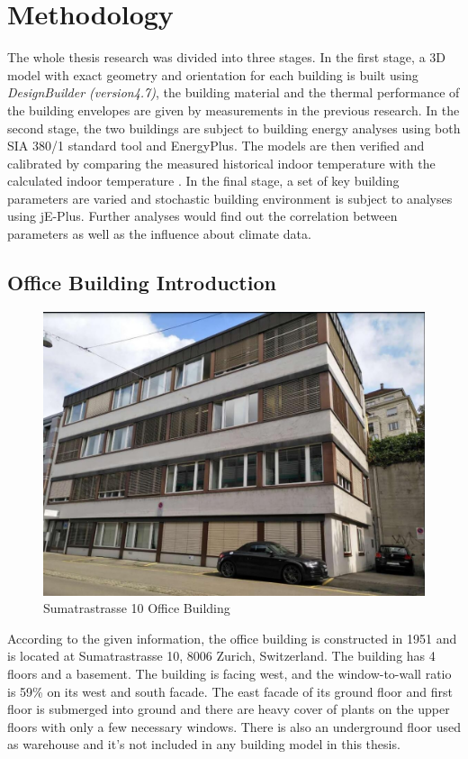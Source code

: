 \documentclass[11pt, a4paper]{article}
\theoremstyle{definition}
\begin{document}
\newpage
\section{Methodology}
	The whole thesis research was divided into three stages. In the first stage, a 3D model with exact geometry and orientation for each building is built using \textit{DesignBuilder (version4.7)}, the building material and the thermal performance of the building envelopes are given by measurements in the previous research. In the second stage, the two buildings are subject to building energy analyses using both SIA 380/1 standard tool and EnergyPlus. The models are then verified and calibrated by comparing the measured historical indoor temperature with the calculated indoor temperature . In the final stage, a set of key building parameters are varied and stochastic building environment is subject to analyses using jE-Plus. Further analyses would find out the correlation between parameters as well as the influence about climate data.

	\subsection{Office Building Introduction}
		
		\begin{figure}[h!]
		\centering
		\includegraphics[scale=0.5]{Sumatra_photo.jpg}
		\caption{Sumatrastrasse 10 Office Building}
		\label{fig:Sumatra_photo}
		\end{figure}
		 
		
		According to the given information, the office building is constructed in 1951 and is located at Sumatrastrasse 10, 8006 Zurich, Switzerland. The building has 4 floors and a basement. The building  is facing west, and the window-to-wall ratio is 59\% on its west and south facade. The east facade of its ground floor and first floor is submerged into ground and there are heavy cover of plants on the upper floors with only a few necessary windows. There is also an underground floor used as warehouse and it's not included in any building model in this thesis.\\
\end{document}
